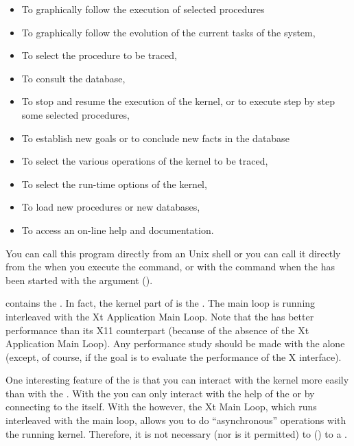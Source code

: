 \begin{itemize}

\item To graphically follow the execution of selected procedures

\item To graphically follow the evolution of  the current tasks of the
system,

\item To select the procedure to be traced,

\item To consult the database,

\item To stop and resume the execution of the kernel, or to execute step
by step some selected procedures,

\item To establish new goals or to conclude new facts in the database

\item To select the various operations of the kernel to be traced,

\item To select the run-time options of the kernel,

\item To load new procedures or new databases,

\item To access an on-line help and documentation.

\end{itemize}

You can call this program directly from an Unix shell or you can call it
directly from the \OPRSS{} when you execute the  command, or
with the  command when the \OPRSS{} has been started with the
 argument (). 

\XPK{} contains the \CPK{}. In fact, the kernel part of
\XOPRS{} is the \CPK{}. The \COPRS{} main loop is running interleaved
with the Xt Application Main Loop. Note that the \CPK{} has better
performance than its X11 counterpart (because of the absence of the Xt
Application Main Loop). Any performance study should be made with the
\CPK{} alone (except, of course, if the goal is to evaluate the
performance of the X interface).

One interesting feature of the \XPK{} is that you can interact with the kernel
more easily than with the \CPK{}. With the \CPK{} you can only interact with
the help of the \OPRSS{} or by connecting to the \COPRS{} itself. With the
\XPK{} however, the Xt Main Loop, which runs interleaved with the \COPRS{} main
loop, allows you to do ``asynchronous'' operations with the running kernel.
Therefore, it is not necessary (nor is it permitted) to 
() to a \XPK{}.

